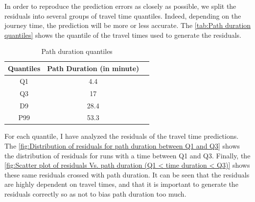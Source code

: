 \documentclass[12pt]{article}
\begin{document}
In order to reproduce the prediction errors as closely as possible, we split the residuals into several groups of travel time quantiles. Indeed, depending on the journey time, the prediction will be more or less accurate. The \autoref{tab:Path duration quantiles} shows the quantile of the travel times used to generate the residuals.


\begin{table}[h]
  \centering
  \caption{Path duration quantiles}
  \label{tab:Path duration quantiles}
  \begin{tabular}{|c|c|c|}
        \toprule
        \textbf{Quantiles} & \textbf{Path Duration (in minute)}  \\
        \midrule
        Q1 & 4.4  \\
        Q3 & 17  \\
        D9 & 28.4  \\
        P99 & 53.3  \\
        \bottomrule
  \end{tabular}
\end{table}  


For each quantile, I have analyzed the residuals of the travel time predictions. The \autoref{fig:Distribution of residuals for path duration between Q1 and Q3} shows the distribution of residuals for runs with a time between Q1 and Q3. Finally, the \autoref{fig:Scatter plot of residuals Vs. path duration (Q1 < time duration < Q3)} shows these same residuals crossed with path duration. It can be seen that the residuals are highly dependent on travel times, and that it is important to generate the residuals correctly so as not to bias path duration too much.
\end{document}
